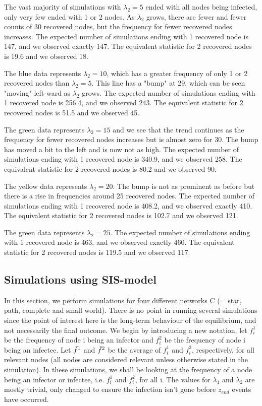 \documentclass[12pt]{article} %
\numberwithin{equation}{section}
\begin{document}
The vast majority of simulations with $\lambda_2 = 5$ ended with all nodes being infected, only very few ended with 1 or 2 nodes. As $\lambda_2$ grows, there are fewer and fewer counts of 30 recovered nodes, but the frequency for fewer recovered nodes increases. The expected number of simulations ending with 1 recovered node is 147, and we observed exactly 147. The equivalent statistic for 2 recovered nodes is 19.6 and we observed 18.

The blue data represents $\lambda_2=10$, which has a greater frequency of only 1 or 2 recovered nodes than $\lambda_2 = 5$. This line has a "bump" at 29, which can be seen "moving" left-ward as $\lambda_2$ grows. The expected number of simulations ending with 1 recovered node is 256.4, and we observed 243. The equivalent statistic for 2 recovered nodes is 51.5 and we observed 45.

The green data represents $\lambda_2 = 15$ and we see that the trend continues as the frequency for fewer recovered nodes increases but is almost zero for 30. The bump has moved a bit to the left and is now not as high. The expected number of simulations ending with 1 recovered node is 340.9, and we observed 258. The equivalent statistic for 2 recovered nodes is 80.2 and we observed 90.

The yellow data represents $\lambda_2 = 20$. The bump is not as prominent as before but there is a rise in frequencies around 25 recovered nodes. The expected number of simulations ending with 1 recovered node is 408.2, and we observed exactly 410. The equivalent statistic for 2 recovered nodes is 102.7 and we observed 121.

The green data represents $\lambda_2 = 25$. The expected number of simulations ending with 1 recovered node is 463, and we observed exactly 460. The equivalent statistic for 2 recovered nodes is 119.5 and we observed 117.




\subsection{Simulations using SIS-model}\label{SISsimsection}
In this section, we perform simulations for four different networks C (= star, path, complete and small world). There is no point in running several simulations since the point of interest here is the long-term behaviour of the equilibrium, and not necessarily the final outcome. We begin by introducing a new notation, let $f^1_i$ be the frequency of node i being an infector and $f^2_i$ be the frequency of node i being an infectee. Let $\Bar{f}^1$ and $\Bar{f}^2$ be the average of $f^1_i$ and $f^2_i$, respectively, for all relevant nodes (all nodes are considered relevant unless otherwise stated in the simulation). In these simulations, we shall be looking at the frequency of a node being an infector or infectee, i.e. $f^1_i$ and $f^2_i$, for all i. The values for $\lambda_1$ and $\lambda_2$ are mostly trivial, only changed to ensure the infection isn't gone before $z_{end}$ events have occurred.
\end{document}
